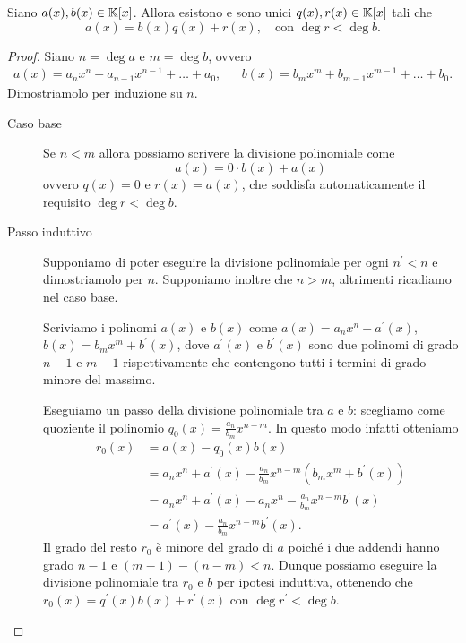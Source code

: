\begin{theorem}
    Siano $a(x), b(x) \in \mathbb{K}[x]$. Allora esistono e sono unici $q(x), r(x) \in \mathbb{K}[x]$ tali che \begin{equation}
        a(x) = b(x)q(x) + r(x), \quad \text{con } \deg r < \deg b.
    \end{equation} 
\end{theorem}
\begin{proof}
    Siano $n = \deg a$ e $m = \deg b$, ovvero \begin{align*}
        a(x) = a_nx^n + a_{n-1}x^{n-1} + \dots + a_0, &&b(x) = b_mx^m + b_{m-1}x^{m-1} + \dots + b_0.
    \end{align*}
    Dimostriamolo per induzione su $n$.
    \begin{description}
        \item[Caso base] Se $n < m$ allora possiamo scrivere la divisione polinomiale come \[
            a(x) = 0\cdot b(x) + a(x)    
        \] ovvero $q(x) = 0$ e $r(x) = a(x)$, che soddisfa automaticamente il requisito $\deg r < \deg b$.
        \item[Passo induttivo] Supponiamo di poter eseguire la divisione polinomiale per ogni $n^\prime < n$ e dimostriamolo per $n$. Supponiamo inoltre che $n > m$, altrimenti ricadiamo nel caso base.
        
        Scriviamo i polinomi $a(x)$ e $b(x)$ come $a(x) = a_nx^n + a^\prime(x)$, $b(x) = b_mx^m + b^\prime(x)$, dove $a^\prime(x)$ e $b^\prime(x)$ sono due polinomi di grado $n-1$ e $m-1$ rispettivamente che contengono tutti i termini di grado minore del massimo.

        Eseguiamo un passo della divisione polinomiale tra $a$ e $b$: scegliamo come quoziente il polinomio $q_0(x) = \frac{a_n}{b_m} x^{n-m}$. In questo modo infatti otteniamo \begin{align*}
            r_0(x) &= a(x) - q_0(x)b(x) \\
            &= a_nx^n + a^\prime(x) - \frac{a_n}{b_m}x^{n-m}(b_mx^m + b^\prime(x)) \\
            &= a_nx^n + a^\prime(x) - a_nx^n - \frac{a_n}{b_m}x^{n-m}b^\prime(x) \\
            &= a^\prime(x) - \frac{a_n}{b_m}x^{n-m}b^\prime(x).
        \end{align*}
        Il grado del resto $r_0$ è minore del grado di $a$ poiché i due addendi hanno grado $n-1$ e $(m-1)-(n-m) < n$. Dunque possiamo eseguire la divisione polinomiale tra $r_0$ e $b$ per ipotesi induttiva, ottenendo che $r_0(x) = q^\prime(x)b(x) + r^\prime(x)$ con $\deg r^\prime < \deg b$. 
        

\end{description}
\end{proof}
